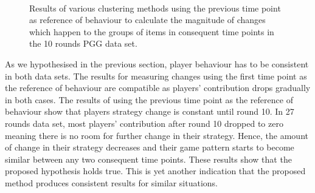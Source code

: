 \begin{figure}[!h]
{\begin{minipage}{\dimexpr \textwidth-2\fboxsep-2\fboxrule}
        \centering
        \\
        
    \end{minipage}}
    \caption{Results of various clustering methods using the previous time point as reference of behaviour to calculate the magnitude of changes which happen to the groups of items in consequent time points in the 10 rounds PGG data set.}
    \label{fig:game10_ChangeMeasuers_Cons}
\end{figure}
        
        
As we hypothesised in the previous section, player behaviour has to be consistent in both data sets. The results for measuring changes using the first time point as the reference of behaviour are compatible as players' contribution drops gradually in both cases. The results of using the previous time point as the reference of behaviour show that players strategy change is constant until round 10. In 27 rounds data set, most players' contribution after round 10 dropped to zero meaning there is no room for further change in their strategy. Hence, the amount of change in their strategy decreases and their game pattern starts to become similar between any two consequent time points. These results show that the proposed hypothesis holds true. This is yet another indication that the proposed method produces consistent results for similar situations.


